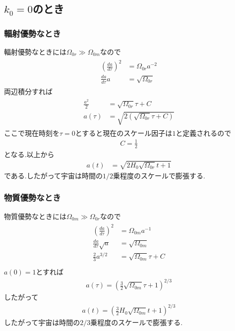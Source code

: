 \documentclass[uplatex,a4j,11pt,dvipdfmx]{jsarticle}
\begin{document}
\subsection{$k_0=0$のとき}
\subsubsection{輻射優勢なとき}
輻射優勢なときには$\Omega_{0r}\gg\Omega_{0m}$なので
\begin{align}
  \begin{split}
    \left(\frac{da}{d\tau}\right)^2&=\Omega_{0r}a^{-2}\\
    \frac{da}{d\tau}a&=\sqrt{\Omega_{0r}}
  \end{split}
\end{align}
両辺積分すれば
\begin{align}
  \begin{split}
    \frac{a^2}{2}&=\sqrt{\Omega_{0r}}\tau+C\\
    a(\tau)&=\sqrt{2(\sqrt{\Omega_{0r}}\tau+C)}
  \end{split}
\end{align}
ここで現在時刻を$\tau=0$とすると現在のスケール因子は$1$と定義されるので
\begin{align}
  C=\frac{1}{2}
\end{align}
となる.以上から
\begin{align}
  a(t)&=\sqrt{2H_0\sqrt{\Omega_{0r}}t+1}
\end{align}
である.したがって宇宙は時間の$1/2$乗程度のスケールで膨張する.
\subsubsection{物質優勢なとき}
物質優勢なときには$\Omega_{0m}\gg\Omega_{0r}$なので
\begin{align}
  \begin{split}
    \left(\frac{da}{d\tau}\right)^2&=\Omega_{0m}a^{-1}\\
    \frac{da}{d\tau}\sqrt{a}&=\sqrt{\Omega_{0m}}\\
    \frac{2}{3}a^{3/2}&=\sqrt{\Omega_{0m}}\tau+C\\
  \end{split}
\end{align}
$a(0)=1$とすれば
\begin{align}
  a(\tau)=\left(\frac{3}{2}\sqrt{\Omega_{0m}}\tau+1\right)^{2/3}
\end{align}
したがって
\begin{align}
  a(t)=\left(\frac{3}{2}H_0\sqrt{\Omega_{0m}}t+1\right)^{2/3}
\end{align}
したがって宇宙は時間の$2/3$乗程度のスケールで膨張する.
\end{document}
